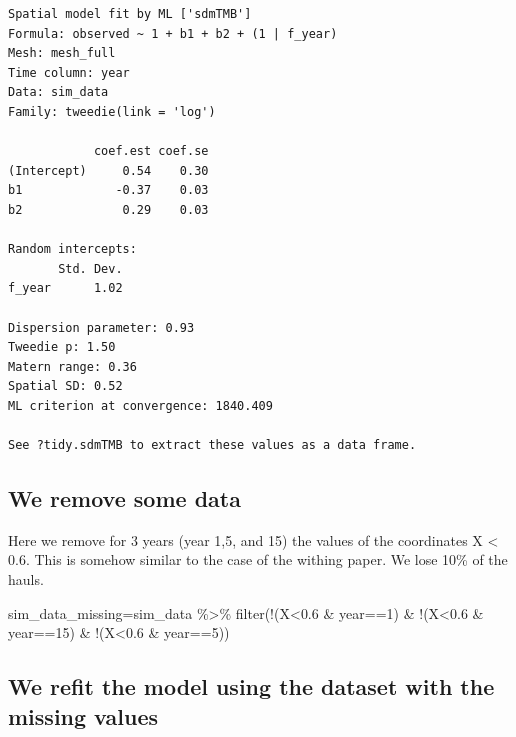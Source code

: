 \documentclass[
  letterpaper,
  DIV=11,
  numbers=noendperiod]{scrartcl}
\newenvironment{Shaded}{\begin{snugshade}}{\end{snugshade}}
\newcommand{\DecValTok}[1]{\textcolor[rgb]{0.68,0.00,0.00}{#1}}
\newcommand{\FloatTok}[1]{\textcolor[rgb]{0.68,0.00,0.00}{#1}}
\newcommand{\FunctionTok}[1]{\textcolor[rgb]{0.28,0.35,0.67}{#1}}
\newcommand{\NormalTok}[1]{\textcolor[rgb]{0.00,0.23,0.31}{#1}}
\newcommand{\OtherTok}[1]{\textcolor[rgb]{0.00,0.23,0.31}{#1}}
\newcommand{\SpecialCharTok}[1]{\textcolor[rgb]{0.37,0.37,0.37}{#1}}
\begin{document}
\begin{verbatim}
Spatial model fit by ML ['sdmTMB']
Formula: observed ~ 1 + b1 + b2 + (1 | f_year)
Mesh: mesh_full
Time column: year
Data: sim_data
Family: tweedie(link = 'log')
 
            coef.est coef.se
(Intercept)     0.54    0.30
b1             -0.37    0.03
b2              0.29    0.03

Random intercepts:
       Std. Dev.
f_year      1.02

Dispersion parameter: 0.93
Tweedie p: 1.50
Matern range: 0.36
Spatial SD: 0.52
ML criterion at convergence: 1840.409

See ?tidy.sdmTMB to extract these values as a data frame.
\end{verbatim}

\hypertarget{we-remove-some-data}{%
\subsection{We remove some data}\label{we-remove-some-data}}

Here we remove for 3 years (year 1,5, and 15) the values of the
coordinates X \textless{} 0.6. This is somehow similar to the case of
the withing paper. We lose 10\% of the hauls.

\begin{Shaded}
\begin{Highlighting}[]
\NormalTok{sim\_data\_missing}\OtherTok{=}\NormalTok{sim\_data }\SpecialCharTok{\%\textgreater{}\%} \FunctionTok{filter}\NormalTok{(}\SpecialCharTok{!}\NormalTok{(X}\SpecialCharTok{\textless{}}\FloatTok{0.6} \SpecialCharTok{\&}\NormalTok{ year}\SpecialCharTok{==}\DecValTok{1}\NormalTok{) }\SpecialCharTok{\&} \SpecialCharTok{!}\NormalTok{(X}\SpecialCharTok{\textless{}}\FloatTok{0.6} \SpecialCharTok{\&}\NormalTok{ year}\SpecialCharTok{==}\DecValTok{15}\NormalTok{) }\SpecialCharTok{\&} \SpecialCharTok{!}\NormalTok{(X}\SpecialCharTok{\textless{}}\FloatTok{0.6} \SpecialCharTok{\&}\NormalTok{ year}\SpecialCharTok{==}\DecValTok{5}\NormalTok{))}
\end{Highlighting}
\end{Shaded}

\hypertarget{we-refit-the-model-using-the-dataset-with-the-missing-values}{%
\subsection{We refit the model using the dataset with the missing
values}\label{we-refit-the-model-using-the-dataset-with-the-missing-values}}
\end{document}
